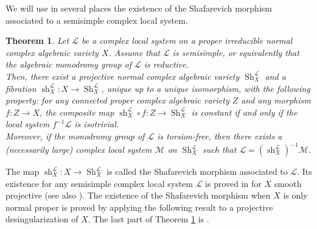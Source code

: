 \documentclass[11pt,letterpaper]{amsart}
\def\cL{\mathcal{L}}
\def\cM{\mathcal{M}}
\theoremstyle{plain}
\newtheorem{thm}{Theorem}[section]
\DeclareMathOperator{\Sh}{Sh}
\DeclareMathOperator{\sh}{sh}
\begin{document}
We will use in several places the existence of the Shafarevich morphism associated to a semisimple complex local system.
\begin{thm}\label{existence of Shafarevich morphism}
Let $\cL$ be a complex local system on a proper irreducible normal complex algebraic variety $X$. Assume that $\cL$ is semisimple, or equivalently that the algebraic monodromy group of $\cL$ is reductive.\\
Then, there exist a projective normal complex algebraic variety $\Sh_X^\cL$ and a fibration $\sh_X^\cL \colon X \rightarrow \Sh_X^\cL$, unique up to a unique isomorphism, with the following property: for any connected proper complex algebraic variety $Z$ and any morphism $f \colon Z \rightarrow X$, the composite map $\sh_X^\cL \circ f \colon Z \rightarrow \Sh_X^\cL$ is constant if and only if the local system
$f^{-1} \cL$ is isotrivial. \\
Moreover, if the monodromy group of $\cL$ is torsion-free, then there exists a (necessarily large) complex local system $\cM$ on $\Sh_X^\cL$ such that $\cL = \left(\sh_X^\cL \right)^{-1} \cM$.
\end{thm}

The map $\sh_X^\cL : X \rightarrow \Sh_X^\cL$ is called the Shafarevich morphism associated to $\cL$. Its existence for any semisimple complex local system $\cL$ is proved in \cite{Eyssidieux-reductive} for $X$ smooth projective (see also \cite{Brunebarbe-Shafarevich}). The existence of the Shafarevich morphism when $X$ is only normal proper is proved by applying the following result to a projective desingularization of $X$. The last part of Theorem \ref{existence of Shafarevich morphism} is \cite[Theorem 10.2]{Brunebarbe-Shafarevich}. 
\end{document}
